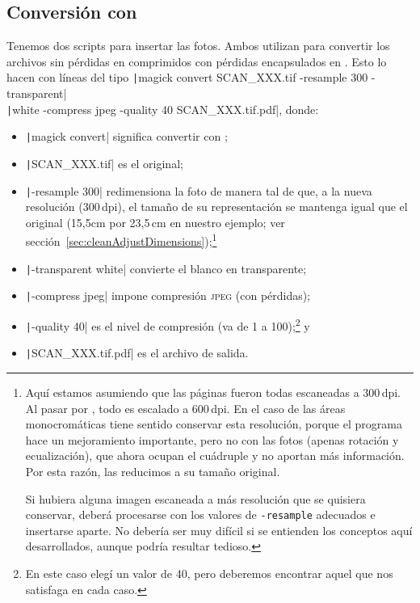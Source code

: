 \documentclass[%
	a5paper,
	10pt,
	twoside,
	openright,
	final,
]{memoir}
\begin{document}
{	\subsection{Conversión con \imagemagick\label{sec:pdfPhotosImageMagick}} Tenemos dos scripts para insertar las fotos. Ambos utilizan \imagemagick para convertir los archivos \tiff sin pérdidas en \jpeg comprimidos con pérdidas encapsulados en \pdf. Esto lo hacen con líneas del tipo \texttt|magick convert SCAN_XXX.tif -resample 300 -transparent|\\
	\texttt|white -compress jpeg -quality 40 SCAN_XXX.tif.pdf|, donde:

	\begin{itemize}[noitemsep]
		\item \texttt|magick convert| significa convertir con \imagemagick;
		\item \texttt|SCAN_XXX.tif| es el \tiff original;
		\item \texttt|-resample 300| redimensiona la foto de manera tal de que, a la nueva resolución (300\,dpi), el tamaño de su representación se mantenga igual que el original (15,5cm por 23,5\,cm en nuestro ejemplo; ver sección~\ref{sec:cleanAdjustDimensions});\footnote{\label{foot:resample}Aquí estamos asumiendo que las páginas fueron todas escaneadas a 300\,dpi. Al pasar por \scantailor, todo es escalado a 600\,dpi. En el caso de las áreas monocromáticas tiene sentido conservar esta resolución, porque el programa hace un mejoramiento importante, pero no con las fotos (apenas rotación y ecualización), que ahora ocupan el cuádruple y no aportan más información. Por esta razón, las reducimos a su tamaño original.

		Si hubiera alguna imagen escaneada a más resolución que se quisiera conservar, deberá procesarse con los valores de \texttt{-resample} adecuados e insertarse aparte. No debería ser muy difícil si se entienden los conceptos aquí desarrollados, aunque podría resultar tedioso.}
		\item \texttt|-transparent white| convierte el blanco en transparente;
		\item \texttt|-compress jpeg| impone compresión \textsc{jpeg} (con pérdidas);
		\item \texttt|-quality 40| es el nivel de compresión (va de 1 a 100);\footnote{En este caso elegí un valor de 40, pero deberemos encontrar aquel que nos satisfaga en cada caso.} y
		\item \texttt|SCAN_XXX.tif.pdf| es el archivo \pdf de salida.
	\end{itemize}

}
\end{document}
